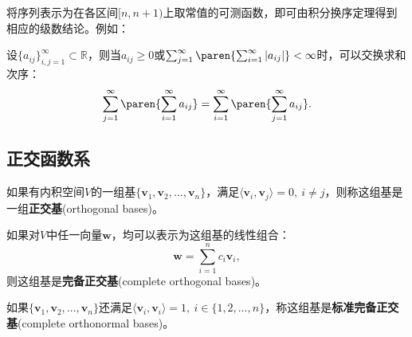 将序列表示为在各区间$[n,n+1)$上取常值的可测函数，即可由积分换序定理得到相应的级数结论。例如：
\begin{corollary}\label{cor:sequence_fubini_tonelli}
    设$\{a_{ij}\}_{i,j=1}^{\infty}\subset\mathbb{R}$，则当$a_{ij}\ge 0$或$\sum_{j=1}^{\infty}\paren{\sum_{i=1}^{\infty}|a_{ij}|}<\infty$时，可以交换求和次序：
    \begin{equation}
        \sum_{j=1}^{\infty}\paren{\sum_{i=1}^{\infty}a_{ij}}=\sum_{i=1}^{\infty}\paren{\sum_{j=1}^{\infty}a_{ij}}.
    \end{equation}
\end{corollary}

\subsection{正交函数系}\label{sub:orthognal}
\begin{definition}[正交基]
    如果有内积空间$V$的一组基$\{\mathbf{v}_1,\mathbf{v}_2,\dots ,\mathbf{v}_n\}$，满足$\langle \mathbf{v}_i,\mathbf{v}_j\rangle =0,\ i \neq j$，则称这组基是一组\textbf{正交基}(orthogonal bases)。

    如果对$V$中任一向量$\mathbf{w}$，均可以表示为这组基的线性组合：
    \begin{equation}
        \mathbf{w}=\sum_{i = 1}^{n} c_i \mathbf{v}_i,
    \end{equation}
    则这组基是\textbf{完备正交基}(complete orthogonal bases)。

    如果$\{\mathbf{v}_1,\mathbf{v}_2,\dots ,\mathbf{v}_n\}$还满足$\langle \mathbf{v}_i,\mathbf{v}_i\rangle =1,\ i\in \{1,2,\dots ,n\}$，称这组基是\textbf{标准完备正交基}(complete orthonormal bases)。
\end{definition}


